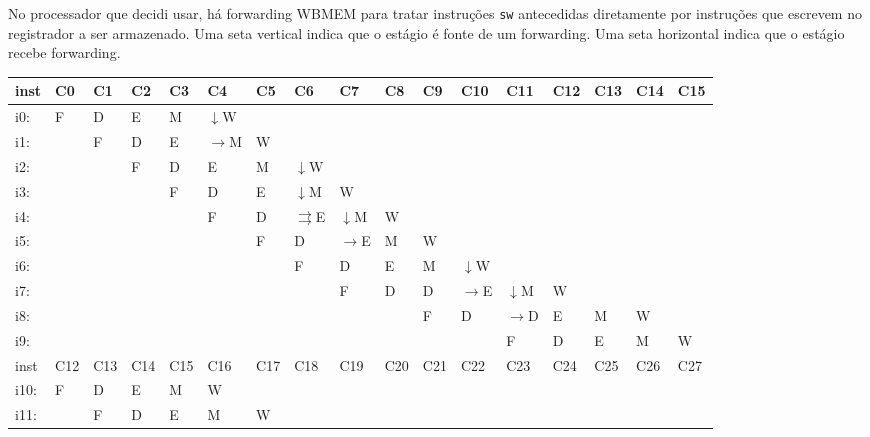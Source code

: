 \documentclass{article}
\begin{document}
No processador que decidi usar, há forwarding WB\textrightarrow MEM para tratar instruções \verb|sw| antecedidas diretamente por instruções que escrevem no registrador a ser armazenado. Uma seta vertical indica que o estágio é fonte de um forwarding. Uma seta horizontal indica que o estágio recebe forwarding.
\begin{table}[H]
\begin{tabular}{|l|l|l|l|l|l|l|l|l|l|l|l|l|l|l|l|l|}
\hline
inst & C0  & C1  & C2  & C3  & C4  & C5  & C6  & C7  & C8  & C9  & C10 & C11 & C12 & C13 & C14 & C15 \\ \hline
i0:  &  F  &  D  &  E  &  M  &$\downarrow$W  &     &     &     &     &     &     &     &     &     &     &     \\ \hline
i1:  &     &  F  &  D  &  E  &$\rightarrow$M  &  W  &     &     &     &     &     &     &     &     &     &     \\ \hline
i2:  &     &     &  F  &  D  &  E  &  M  &$\downarrow$W  &     &     &     &     &     &     &     &     &     \\ \hline
i3:  &     &     &     &  F  &  D  &  E  &$\downarrow$M  &  W  &     &     &     &     &     &     &     &     \\ \hline
i4:  &     &     &     &     &  F  &  D  &$\rightrightarrows$E  &$\downarrow$M  &  W  &     &     &     &     &     &     &     \\ \hline
i5:  &     &     &     &     &     &  F  &  D  &$\rightarrow$E  &  M  &  W  &     &     &     &     &     &     \\ \hline
i6:  &     &     &     &     &     &     &  F  &  D  &  E  &  M  &$\downarrow$W  &     &     &     &     &     \\ \hline
i7:  &     &     &     &     &     &     &     &  F  &  D  &  D  &$\rightarrow$E  &$\downarrow$M  &  W  &     &     &     \\ \hline
i8:  &     &     &     &     &     &     &     &     &     &  F  &  D  &$\rightarrow$D  &  E  &  M  &  W  &     \\ \hline
i9:  &     &     &     &     &     &     &     &     &     &     &     &  F  &  D  &  E  &  M  &  W  \\ \hline
inst & C12 & C13 & C14 & C15 & C16 & C17 & C18 & C19 & C20 & C21 & C22 & C23 & C24 & C25 & C26 & C27 \\ \hline
i10: &  F  &  D  &  E  &  M  &  W  &     &     &     &     &     &     &     &     &     &     &     \\ \hline
i11: &     &  F  &  D  &  E  &  M  &  W  &     &     &     &     &     &     &     &     &     &     \\ \hline

\end{tabular}
\end{table}
\end{document}
